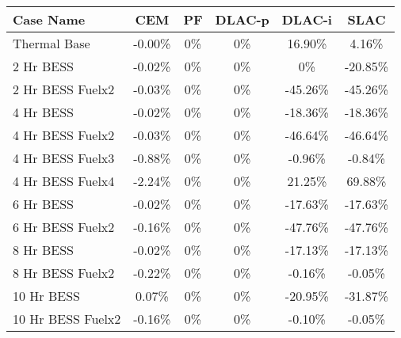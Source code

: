\begin{tabular}{lccccc}
\toprule
Case Name & CEM & PF & DLAC-p & DLAC-i & SLAC \\
\midrule
Thermal Base & -0.00\% & 0\% & 0\% & 16.90\% & 4.16\% \\
2 Hr BESS & -0.02\% & 0\% & 0\% & 0\% & -20.85\% \\
2 Hr BESS Fuelx2 & -0.03\% & 0\% & 0\% & -45.26\% & -45.26\% \\
4 Hr BESS & -0.02\% & 0\% & 0\% & -18.36\% & -18.36\% \\
4 Hr BESS Fuelx2 & -0.03\% & 0\% & 0\% & -46.64\% & -46.64\% \\
4 Hr BESS Fuelx3 & -0.88\% & 0\% & 0\% & -0.96\% & -0.84\% \\
4 Hr BESS Fuelx4 & -2.24\% & 0\% & 0\% & 21.25\% & 69.88\% \\
6 Hr BESS & -0.02\% & 0\% & 0\% & -17.63\% & -17.63\% \\
6 Hr BESS Fuelx2 & -0.16\% & 0\% & 0\% & -47.76\% & -47.76\% \\
8 Hr BESS & -0.02\% & 0\% & 0\% & -17.13\% & -17.13\% \\
8 Hr BESS Fuelx2 & -0.22\% & 0\% & 0\% & -0.16\% & -0.05\% \\
10 Hr BESS & 0.07\% & 0\% & 0\% & -20.95\% & -31.87\% \\
10 Hr BESS Fuelx2 & -0.16\% & 0\% & 0\% & -0.10\% & -0.05\% \\
\bottomrule
\end{tabular}
